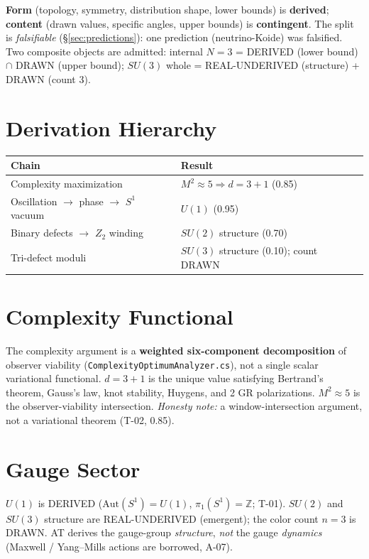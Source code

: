 \documentclass[11pt,a4paper]{article}
\begin{document}
\textbf{Form} (topology, symmetry, distribution shape, lower bounds) is \textbf{derived};
\textbf{content} (drawn values, specific angles, upper bounds) is \textbf{contingent}. The
split is \emph{falsifiable} (§\ref{sec:predictions}): one prediction (neutrino-Koide) was
falsified. Two composite objects are admitted: internal $N=3$ =
DERIVED (lower bound) $\cap$ DRAWN (upper bound); $SU(3)$ whole =
REAL-UNDERIVED (structure) + DRAWN (count 3).

\section{Derivation Hierarchy}
\label{sec:hierarchy}

\begin{center}
\begin{tabular}{ll}
\toprule
Chain & Result \\
\midrule
Complexity maximization & $M^2\approx5\Rightarrow d=3{+}1$ (0.85) \\
Oscillation $\to$ phase $\to$ $S^1$ vacuum & $U(1)$ (0.95) \\
Binary defects $\to$ $Z_2$ winding & $SU(2)$ structure (0.70) \\
Tri-defect moduli & $SU(3)$ structure (0.10); count DRAWN \\
\bottomrule
\end{tabular}
\end{center}

\section{Complexity Functional}
\label{sec:complexity}

The complexity argument is a \textbf{weighted six-component decomposition} of observer
viability (\texttt{ComplexityOptimumAnalyzer.cs}), not a single scalar variational
functional. $d=3{+}1$ is the unique value satisfying Bertrand's theorem, Gauss's law,
knot stability, Huygens, and 2 GR polarizations. $M^2\approx5$ is the
observer-viability intersection. \emph{Honesty note:} a window-intersection argument, not
a variational theorem (T-02, 0.85).

\section{Gauge Sector}
\label{sec:gauge}

$U(1)$ is DERIVED ($\mathrm{Aut}(S^1)=U(1)$, $\pi_1(S^1)=\mathbb{Z}$; T-01). $SU(2)$ and
$SU(3)$ structure are REAL-UNDERIVED (emergent); the color count $n=3$ is DRAWN. AT
derives the gauge-group \emph{structure}, \emph{not} the gauge \emph{dynamics} (Maxwell /
Yang--Mills actions are borrowed, A-07).
\end{document}
